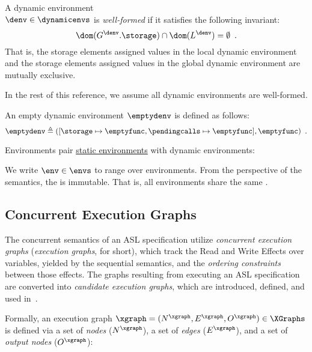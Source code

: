 \begin{definition}
A dynamic environment \\
$\denv\in\dynamicenvs$ is \emph{well-formed} if it satisfies the following invariant:
\[
\dom(G^\denv.\storage) \cap \dom(L^\denv) = \emptyset \enspace.
\]
That is, the storage elements assigned values in the local dynamic environment
and the storage elements assigned values in the global dynamic environment
are mutually exclusive.
\end{definition}
In the rest of this reference, we assume all dynamic environments
are well-formed.

\hypertarget{constant-emptydenv}{}
An empty dynamic environment $\emptydenv$ is defined as follows:
\[
\emptydenv \triangleq ([\storage \mapsto \emptyfunc, \pendingcalls \mapsto \emptyfunc], \emptyfunc) \enspace.
\]

\hypertarget{def-envs}{}
\begin{definition}[Environments]
Environments pair \hyperlink{type-staticenvs}{static environments} with dynamic environments:

\end{definition}
We write $\env \in \envs$ to range over environments.
%
From the perspective of the semantics, the \staticenvironmentterm{} is immutable.
That is, all environments share the same \staticenvironmentterm{}.

\subsection{Concurrent Execution Graphs\label{sec:concurrentexecutiongraphs}}
\hypertarget{def-executiongraph}{}
The concurrent semantics of an ASL specification utilize \emph{concurrent execution graphs}
(\emph{execution graphs}, for short),
which track the Read and Write Effects over variables, yielded by the sequential semantics,
and the \emph{ordering constraints} between those effects.
The graphs resulting from executing an ASL specification are converted into
\emph{candidate execution graphs}, which are introduced, defined,
and used in~\cite{AlglaveMT14,alglave2016syntax,AlglaveDGHM21}.

Formally, an execution graph $\xgraph = (N^\xgraph, E^\xgraph, O^\xgraph) \in \XGraphs$
is defined via a set of \emph{nodes} ($N^\xgraph$), a set of \emph{edges} ($E^\xgraph$), and a set of \emph{output nodes} ($O^\xgraph$):

